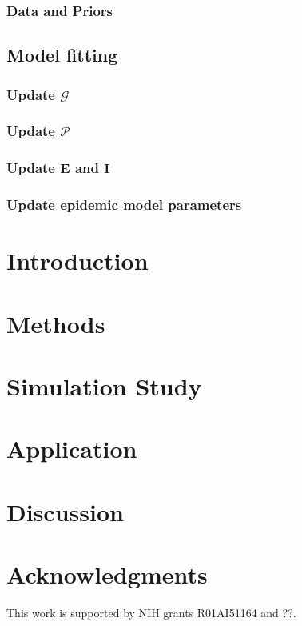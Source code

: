\documentclass{article}
\begin{document}
    \subsubsection{Data and Priors}

    \subsection{Model fitting}

    \subsubsection{Update $\mathscr{G}$}

    \subsubsection{Update $\mathscr{P}$}

    \subsubsection{Update $\mathbf{E}$ and $\mathbf{I}$}

    \subsubsection{Update epidemic model parameters}

\section{Introduction}

\section{Methods} \label{sec:method}

\section{Simulation Study}\label{sec:simulation}

\section{Application}
\label{sec:application}

\section{Discussion}

\section*{Acknowledgments}

This work is supported by NIH grants R01AI51164 and ??.


%

\end{document}
